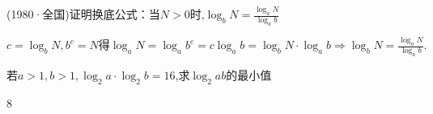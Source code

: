 \begin{problem}
    (1980·全国)证明换底公式：当$N>0$时,$\displaystyle \log_bN=\frac{\log_aN}{\log_ab}$\\ 
    \begin{jiexi}
        $\displaystyle c=\log_bN,b^c=N\text{得}\log_aN=\log_a{b^c}=c\log_ab=\log_bN\cdot\log_ab \Rightarrow \log_bN=\frac{\log_aN}{\log_ab}.$
    \end{jiexi}
\end{problem}

\begin{problem}
    若$a>1,b>1,\log_2a\cdot\log_2b=16$,求$\log_2{ab}$的最小值
    \begin{jiexi}
        8
    \end{jiexi}
\end{problem}

